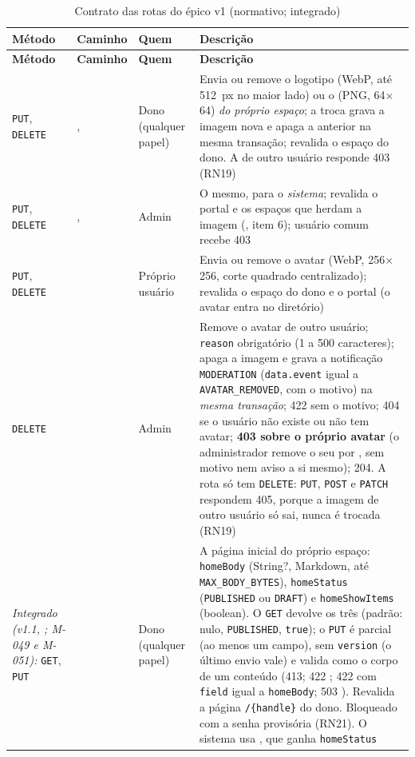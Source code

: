 \begin{longtable}{@{}L{1.5cm}L{4.1cm}L{2.1cm}L{6.1cm}@{}}
\caption{Contrato das rotas do épico v1 (normativo; integrado)}\label{tab:api-v1}\\
\toprule
\textbf{Método} & \textbf{Caminho} & \textbf{Quem} & \textbf{Descrição}\\
\midrule
\endfirsthead
\toprule
\textbf{Método} & \textbf{Caminho} & \textbf{Quem} & \textbf{Descrição}\\
\midrule
\endhead
\bottomrule
\endfoot
\texttt{PUT}, \texttt{DELETE} & ,  & Dono (qualquer papel) & Envia ou remove o logotipo (WebP, até 512~px no maior lado) ou o  (PNG, 64$\times$64) \emph{do próprio espaço}; a troca grava a imagem nova e apaga a anterior na mesma transação; revalida o espaço do dono. A de outro usuário responde 403 (RN19)\\[1pt]
\texttt{PUT}, \texttt{DELETE} & ,  & Admin & O mesmo, para o \emph{sistema}; revalida o portal e os espaços que herdam a imagem (, item 6); usuário comum recebe 403\\[1pt]
\texttt{PUT}, \texttt{DELETE} &  & Próprio usuário & Envia ou remove o avatar (WebP, 256$\times$256, corte quadrado centralizado); revalida o espaço do dono e o portal (o avatar entra no diretório)\\[1pt]
\texttt{DELETE} &  & Admin & Remove o avatar de outro usuário; \texttt{reason} obrigatório (1 a 500 caracteres); apaga a imagem e grava a notificação \texttt{MODERATION} (\texttt{data.event} igual a \texttt{AVATAR\_REMOVED}, com o motivo) na \emph{mesma transação}; 422 sem o motivo; 404 se o usuário não existe ou não tem avatar; \textbf{403 sobre o próprio avatar} (o administrador remove o seu por , sem motivo nem aviso a si mesmo); 204. A rota só tem \texttt{DELETE}: \texttt{PUT}, \texttt{POST} e \texttt{PATCH} respondem 405, porque a imagem de outro usuário só sai, nunca é trocada (RN19)\\[1pt]
\emph{Integrado (v1.1, ; M-049 e M-051):} \texttt{GET}, \texttt{PUT} &  & Dono (qualquer papel) & A página inicial do próprio espaço: \texttt{homeBody} (String?, Markdown, até \texttt{MAX\_BODY\_BYTES}), \texttt{homeStatus} (\texttt{PUBLISHED} ou \texttt{DRAFT}) e \texttt{homeShowItems} (boolean). O \texttt{GET} devolve os três (padrão: nulo, \texttt{PUBLISHED}, \texttt{true}); o \texttt{PUT} é parcial (ao menos um campo), sem \texttt{version} (o último envio vale) e valida como o corpo de um conteúdo (413; 422 ; 422  com \texttt{field} igual a \texttt{homeBody}; 503 ). Revalida a página \texttt{/\{handle\}} do dono. Bloqueado com a senha provisória (RN21). O sistema usa , que ganha \texttt{homeStatus}\\[1pt]

\end{longtable}
